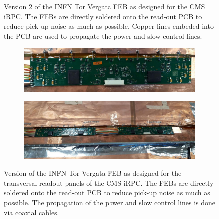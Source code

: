 \begin{figure}[H]
\begin{subfigure}{.5\linewidth}
			\caption{\label{fig:INFN_FEBv2:B}}
		\end{subfigure}
		\caption{\label{fig:INFN_FEBv2} Version 2 of the INFN Tor Vergata FEB as designed for the CMS iRPC. The FEBs are directly soldered onto the read-out PCB to reduce pick-up noise as much as possible. Copper lines embeded into the PCB are used to propagate the power and slow control lines.}
    \end{figure}
	 
	\begin{figure}[H]
		\begin{subfigure}{\linewidth}
		    \centering
			\includegraphics[width = .8\linewidth]{fig/chapt6/INFN-FEB-Transverse.png}
			\caption{\label{fig:INFN_FEB_Trans:A}}
		\end{subfigure}
		\begin{subfigure}{\linewidth}
		    \centering
			\includegraphics[width = .8\linewidth]{fig/chapt6/INFN-FEB-Transverse-on-readout.png}
			\caption{\label{fig:INFN_FEB_Trans:B}}
		\end{subfigure}
		\caption{\label{fig:INFN_FEB_Trans} Version of the INFN Tor Vergata FEB as designed for the transversal readout panels of the CMS iRPC. The FEBs are directly soldered onto the read-out PCB to reduce pick-up noise as much as possible. The propagation of the power and slow control lines is done via coaxial cables.}
    \end{figure}
	 

